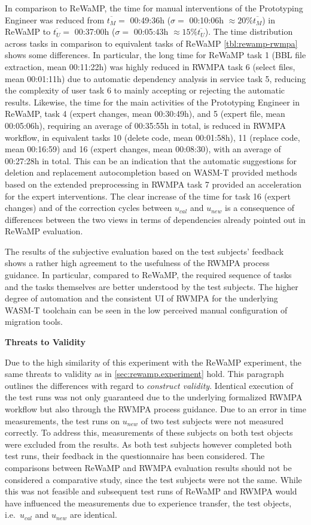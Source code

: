 In comparison to ReWaMP, the time for manual interventions of the Prototyping Engineer was reduced from \(\overline{t_M}=\) 00:49:36h (\(\sigma =\) 00:10:06h \(\approx 20\% \overline{t_M}\)) in ReWaMP to \(\overline{t_U}=\) 00:37:00h (\(\sigma =\) 00:05:43h \(\approx 15\% \overline{t_U}\)).
The time distribution across tasks in comparison to equivalent tasks of ReWaMP \cref{tbl:rewamp-rwmpa} shows some differences.
In particular, the long time for ReWaMP task 1 (BBL file extraction, mean 00:11:22h) was highly reduced in RWMPA task 6 (select files, mean 00:01:11h) due to automatic dependency analysis in service task 5, reducing the complexity of user task 6 to mainly accepting or rejecting the automatic results.
Likewise, the time for the main activities of the Prototyping Engineer in ReWaMP, task 4 (expert changes, mean 00:30:49h), and 5 (expert file, mean 00:05:06h), requiring an average of 00:35:55h in total, is reduced in RWMPA workflow, in equivalent tasks 10 (delete code, mean 00:01:58h), 11 (replace code, mean 00:16:59) and 16 (expert changes, mean 00:08:30), with an average of 00:27:28h in total.
This can be an indication that the automatic suggestions for deletion and replacement autocompletion based on WASM-T provided methods based on the extended preprocessing in RWMPA task 7 provided an acceleration for the expert interventions.
The clear increase of the time for task 16 (expert changes) and of the correction cycles between \(u_{cal}\) and \(u_{new}\) is a consequence of differences between the two views in terms of dependencies already pointed out in ReWaMP evaluation.

The results of the subjective evaluation based on the test subjects' feedback shows a rather high agreement to the usefulness of the RWMPA process guidance.
In particular, compared to ReWaMP, the required sequence of tasks and the tasks themselves are better understood by the test subjects.
The higher degree of automation and the consistent UI of RWMPA for the underlying WASM-T toolchain can be seen in the low perceived manual configuration of migration tools.

\textbf{Threats to Validity}

Due to the high similarity of this experiment with the ReWaMP experiment, the same threats to validity as in \cref{sec:rewamp.experiment} hold.
This paragraph outlines the differences with regard to \emph{construct validity}.
Identical execution of the test runs was not only guaranteed due to the underlying formalized RWMPA workflow but also through the RWMPA process guidance.
Due to an error in time measurements, the test runs on \(u_{new}\) of two test subjects were not measured correctly.
To address this, measurements of these subjects on both test objects were excluded from the results.
As both test subjects however completed both test runs, their feedback in the questionnaire has been considered.
The comparisons between ReWaMP and RWMPA evaluation results should not be considered a comparative study, since the test subjects were not the same.
While this was not feasible and subsequent test runs of ReWaMP and RWMPA would have influenced the measurements due to experience transfer, the test objects, i.e.~\(u_{cal}\) and \(u_{new}\) are identical.

